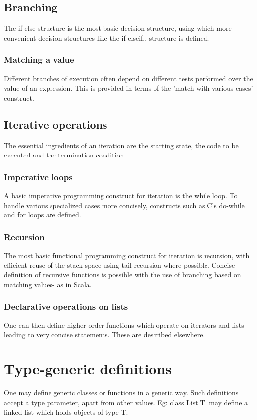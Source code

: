 \documentclass[oneside, article]{memoir}
\begin{document}
\subsection{Branching}
The if-else structure is the most basic decision structure, using which more convenient decision structures like the if-elseif.. structure is defined.

\subsubsection{Matching a value}
Different branches of execution often depend on different tests performed over the value of an expression. This is provided in terms of the 'match with various cases' construct.

\subsection{Iterative operations}
The essential ingredients of an iteration are the starting state, the code to be executed and the termination condition.

\subsubsection{Imperative loops}
A basic imperative programming construct for iteration is the while loop. To handle various specialized cases more concisely, constructs such as C's do-while and for loops are defined.

\subsubsection{Recursion}
The most basic functional programming construct for iteration is recursion, with efficient reuse of the stack space using tail recursion where possible. Concise definition of recursive functions is possible with the use of branching based on matching values- as in Scala.

\subsubsection{Declarative operations on lists}
One can then define higher-order functions which operate on iterators and lists leading to very concise statements. These are described elsewhere. 


\section{Type-generic definitions}
One may define generic classes or functions in a generic way. Such definitions accept a type parameter, apart from other values. Eg: class List[T] may define a linked list which holds objects of type T.
\end{document}
